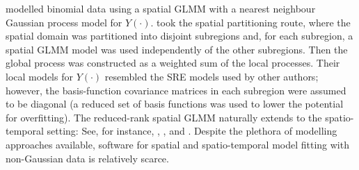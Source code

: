 \documentclass[nojss]{jss}
\begin{document}
 \cite{Finley_2020_spNNGP} modelled binomial data using a spatial GLMM with a nearest neighbour Gaussian process \citep[NNGP; ][]{Datta_2016_NNGP_spatial} model for $Y(\cdot)$.  
 \cite{Lee_2020_partitioned_domain_basis_function_non_Gaussian} %
 took the spatial partitioning route, where the spatial domain was partitioned into disjoint subregions and, for each subregion, 
 a spatial GLMM model 
 was used independently of the other subregions. 
 Then the global process was constructed as a weighted sum of the local processes. 
 Their local models for $Y(\cdot)$ resembled the SRE models used by other authors; however, the basis-function covariance matrices in each subregion were assumed to be diagonal 
 (a reduced set of basis functions was used to lower the potential for overfitting). %
 The reduced-rank spatial GLMM naturally extends to the spatio-temporal setting: See, for instance,  \cite{Lopes_2011_spatial_GLMM_reduced_rank_factor_analytic_model}, 
\citet{Bradley_2018_computationally_efficient_multivariate_ST_models_for_high-dimensional_count-valued_data}, and \citet{Bradley_2019_ST_models_for_big_multinomial_data_using_conditional_multivariate_logit_beta_distribution}. 
 Despite the plethora of modelling approaches available, software for spatial and spatio-temporal model fitting with non-Gaussian data is relatively scarce. %
 
\end{document}

